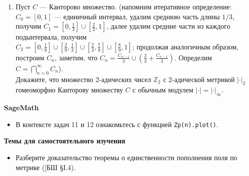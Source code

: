 \begin{enumerate}[topsep=0pt]
    \item Пуст $C$ --- Канторово множество. (напомним итеративное определение: $C_0=[0,1]$ --- единичный интервал, удалим среднюю часть длины $1/3$, получим $C_1=[0,\frac{1}{3}]\cup [\frac{2}{3},1]$, далее удалим средние части из каждого подынтервала, получим\\ $C_2=[0,\frac{1}{9}]\cup [\frac{2}{9},\frac{1}{3}]\cup [\frac{2}{3},\frac{7}{9}]\cup [\frac{8}{9},1]$; продолжая аналогичным образом, построим $C_n$, заметим, что $C_n = \frac{C_{n-1}}{3} \cup \left(\frac{2}{3} + \frac{C_{n-1}}{3} \right)$. Определим $C = \bigcap\limits_{n=0}^\infty C_n$).\\
    Докажите, что множество $2$-адических чисел $\mathbb{Z}_2$ с $2$-адической метрикой $|\cdot|_2$ гомеоморфно Канторову множеству $C$ с обычным модулем $|\cdot|=|\cdot|_\infty$.

\end{enumerate}

\noindent\textbf{SageMath}
\begin{itemize}[topsep=0pt]
    \item В контексте задач 11 и 12 ознакомьтесь с функцией \texttt{Zp(n).plot()}.
\end{itemize}

\noindent\textbf{Темы для самостоятельного изучения}
\begin{itemize}[topsep=0pt]
    \item Разберите доказательство теоремы о единственности пополнения поля по метрике ([БШ \S I.4).
\end{itemize}
